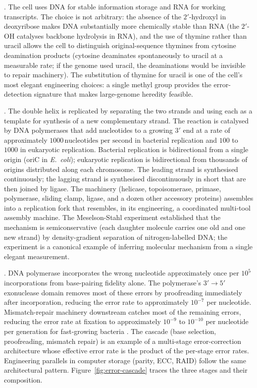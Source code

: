 . The cell uses DNA for stable information
storage and RNA for working transcripts. The choice is not arbitrary:
the absence of the $2'$-hydroxyl in deoxyribose makes DNA
substantially more chemically stable than RNA (the $2'$-OH catalyses
backbone hydrolysis in RNA), and the use of thymine rather than
uracil allows the cell to distinguish original-sequence thymines from
cytosine deamination products (cytosine deaminates spontaneously to
uracil at a measurable rate; if the genome used uracil, the deaminations
would be invisible to repair machinery). The substitution of thymine
for uracil is one of the cell's most elegant engineering choices: a
single methyl group provides the error-detection signature that
makes large-genome heredity feasible.

. The double helix is replicated by separating
the two strands and using each as a template for synthesis of a new
complementary strand. The reaction is catalysed by DNA polymerases
that add nucleotides to a growing $3'$ end at a rate of approximately
$1000\,\text{nucleotides per second}$ in bacterial replication and
$100$ to $1000$ in eukaryotic replication. Bacterial replication is
bidirectional from a single origin (oriC in \emph{E.~coli}); eukaryotic
replication is bidirectional from thousands of origins distributed
along each chromosome. The leading strand is synthesised continuously;
the lagging strand is synthesised discontinuously in short
 that are then joined by ligase. The
machinery (helicase, topoisomerase, primase, polymerase, sliding clamp,
ligase, and a dozen other accessory proteins) assembles into a
replication fork that resembles, in its engineering, a coordinated
multi-tool assembly machine. The Meselson-Stahl experiment
\cite{paper:v6c03-meselson-stahl-1958} established that the mechanism
is semiconservative (each daughter molecule carries one old and one
new strand) by density-gradient separation of nitrogen-labelled DNA;
the experiment is a canonical example of inferring molecular mechanism
from a single elegant measurement.

. DNA polymerase
incorporates the wrong nucleotide approximately once per $10^5$
incorporations from base-pairing fidelity alone. The polymerase's
$3' \rightarrow 5'$ exonuclease domain removes most of these errors
by proofreading immediately after incorporation, reducing the error
rate to approximately $10^{-7}$ per nucleotide. Mismatch-repair
machinery downstream catches most of the remaining errors, reducing
the error rate at fixation to approximately $10^{-9}$ to $10^{-10}$
per nucleotide per generation for fast-growing bacteria
\cite[ch.~25]{text:lehninger-biochemistry}. The cascade (base
selection, proofreading, mismatch repair) is an example of a
multi-stage error-correction architecture whose effective error rate
is the product of the per-stage error rates. Engineering parallels
in computer storage (parity, ECC, RAID) follow the same architectural
pattern. Figure~\ref{fig:error-cascade} traces the three stages and
their composition.

